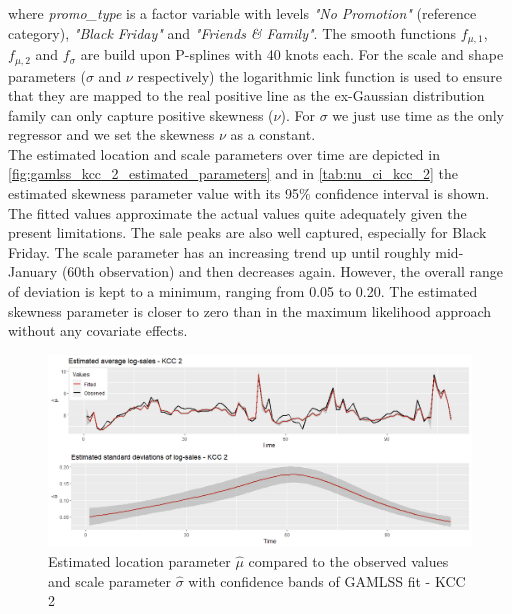 where \textit{promo\_type} is a factor variable with levels \textit{"No Promotion"} (reference category), \textit{"Black Friday"} and \textit{"Friends \& Family"}. The smooth functions $f_{\mu ,1}$, $f_{\mu ,2}$ and $f_{\sigma}$ are build upon P-splines with 40 knots each. For the scale and shape parameters ($\sigma$ and $\nu$ respectively) the logarithmic link function is used to ensure that they are mapped to the real positive line as the ex-Gaussian distribution family can only capture positive skewness ($\nu$). For $\sigma$ we just use time as the only regressor and we set the skewness $\nu$ as a constant.\\
 The estimated location and scale parameters over time are depicted in \autoref{fig:gamlss_kcc_2_estimated_parameters} and in \autoref{tab:nu_ci_kcc_2} the estimated skewness parameter value with its 95\% confidence interval is shown. The fitted values approximate the actual values quite adequately given the present limitations. The sale peaks are also well captured, especially for Black Friday. The scale parameter has an increasing trend up until roughly mid-January (60th observation) and then decreases again. However, the overall range of deviation is kept to a minimum, ranging from 0.05 to 0.20. The estimated skewness parameter is closer to zero than in the maximum likelihood approach without any covariate effects.
\\


\begin{figure}[H]
\centering
  \includegraphics[width=0.95\linewidth]{figures/gamlss_kcc_2_estimated_parameters.png}
  \caption{Estimated location parameter $\hat{\mu}$ compared to the observed values and scale parameter $\hat{\sigma}$ with confidence bands of GAMLSS fit - KCC 2}
  \label{fig:gamlss_kcc_2_estimated_parameters}
\end{figure}





